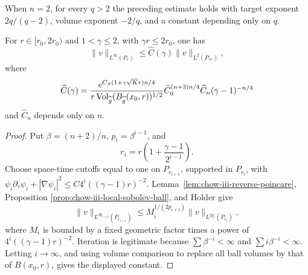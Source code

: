 \begin{remark}
\label{rem:chow-iii-two-dimensional-local-sobolev}

When \(n=2\), for every \(q>2\) the preceding estimate holds with target
exponent \(2q/(q-2)\), volume exponent \(-2/q\), and a constant depending
only on \(q\).
\end{remark}

\begin{lemma}
\label{lem:chow-iii-moser-cylinder-iteration}


For \(r\in[r_0,2r_0)\) and \(1<\gamma\leq2\), with
\(\gamma r\leq2r_0\), one has
\[
 \|v\|_{L^\infty(P_r)}\leq \widehat C(\gamma)
 \|v\|_{L^2(P_{\gamma r})},
\]
where
\[
 \widehat C(\gamma)=
 \frac{e^{C_S(1+\gamma\sqrt K r)n/4}}
 {r\operatorname{Vol}_{\widetilde g}(B_{\widetilde g}(x_0,r))^{1/2}}
 \widetilde C_0^{(n+3)n/4}\widehat C_n
 (\gamma-1)^{-n/4}
\]
and \(\widehat C_n\) depends only on \(n\).
\end{lemma}
\begin{proof}
\sketch Put \(\beta=(n+2)/n\), \(p_i=\beta^{i-1}\), and
\[
 r_i=r\left(1+\frac{\gamma-1}{2^{i-1}}\right).
\]
Choose space-time cutoffs equal to one on \(P_{r_{i+1}}\), supported in
\(P_{r_i}\), with
\(\psi_i\partial_\tau\psi_i+|\nabla\psi_i|^2
 \leq C4^i((\gamma-1)r)^{-2}\).
Lemma~\ref{lem:chow-iii-reverse-poincare}, Proposition
\ref{prop:chow-iii-local-sobolev-ball}, and Holder give
\[
 \|v\|_{L^{2p_{i+1}}(P_{r_{i+1}})}
 \leq M_i^{1/(2p_{i+1})}
 \|v\|_{L^{2p_i}(P_{r_i})},
\]
where \(M_i\) is bounded by a fixed geometric factor times a power of
\(4^i((\gamma-1)r)^{-2}\).  Iteration is legitimate because
\(\sum\beta^{-i}<\infty\) and \(\sum i\beta^{-i}<\infty\).  Letting
\(i\to\infty\), and using volume comparison to replace all ball volumes by
that of \(B(x_0,r)\), gives the displayed constant.
\end{proof}

